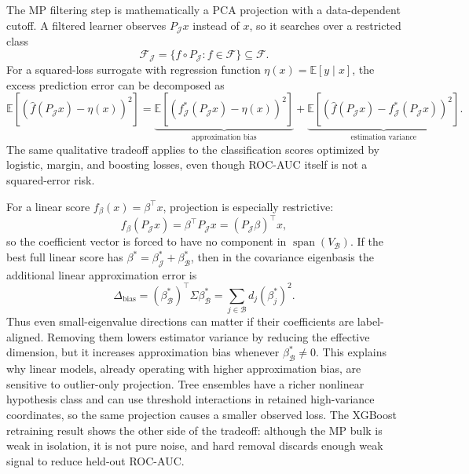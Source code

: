\documentclass{article}
\begin{document}
The MP filtering step is mathematically a PCA projection with a data-dependent cutoff. A filtered learner observes \(P_{\mathcal{J}}x\) instead of \(x\), so it searches over a restricted class
\begin{equation}
  \mathcal{F}_{\mathcal{J}}=\{f\circ P_{\mathcal{J}}:f\in\mathcal{F}\}\subseteq\mathcal{F}.
\end{equation}
For a squared-loss surrogate with regression function \(\eta(x)=\mathbb{E}[y\mid x]\), the excess prediction error can be decomposed as
\begin{equation}
  \mathbb{E}\left[(\hat f(P_{\mathcal{J}}x)-\eta(x))^2\right]
  =
  \underbrace{\mathbb{E}\left[(f^*_{\mathcal{J}}(P_{\mathcal{J}}x)-\eta(x))^2\right]}_{\text{approximation bias}}
  +
  \underbrace{\mathbb{E}\left[(\hat f(P_{\mathcal{J}}x)-f^*_{\mathcal{J}}(P_{\mathcal{J}}x))^2\right]}_{\text{estimation variance}}.
\end{equation}
The same qualitative tradeoff applies to the classification scores optimized by logistic, margin, and boosting losses, even though ROC-AUC itself is not a squared-error risk.

For a linear score \(f_\beta(x)=\beta^\top x\), projection is especially restrictive:
\[
  f_\beta(P_{\mathcal{J}}x)=\beta^\top P_{\mathcal{J}}x=(P_{\mathcal{J}}\beta)^\top x,
\]
so the coefficient vector is forced to have no component in \(\operatorname{span}(V_{\mathcal{B}})\). If the best full linear score has \(\beta^*=\beta^*_{\mathcal{J}}+\beta^*_{\mathcal{B}}\), then in the covariance eigenbasis the additional linear approximation error is
\begin{equation}
  \Delta_{\mathrm{bias}}
  =
  (\beta^*_{\mathcal{B}})^\top\Sigma\beta^*_{\mathcal{B}}
  =
  \sum_{j\in\mathcal{B}}d_j(\beta^*_j)^2.
\end{equation}
Thus even small-eigenvalue directions can matter if their coefficients are label-aligned. Removing them lowers estimator variance by reducing the effective dimension, but it increases approximation bias whenever \(\beta^*_{\mathcal{B}}\ne0\). This explains why linear models, already operating with higher approximation bias, are sensitive to outlier-only projection. Tree ensembles have a richer nonlinear hypothesis class and can use threshold interactions in retained high-variance coordinates, so the same projection causes a smaller observed loss. The XGBoost retraining result shows the other side of the tradeoff: although the MP bulk is weak in isolation, it is not pure noise, and hard removal discards enough weak signal to reduce held-out ROC-AUC.
\end{document}
